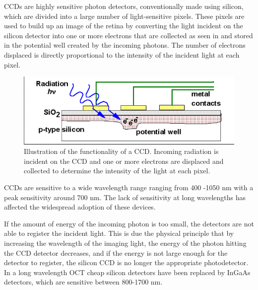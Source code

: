 CCDs are highly sensitive photon detectors, conventionally made using 
silicon, which are divided into a large number of light-sensitive pixels.  These 
pixels are used to build up an image of the retina by converting the light 
incident on the silicon detector into one or more electrons that are collected 
as seen in  and stored in the potential well created by the incoming 
photons. The number of electrons displaced is directly proportional to the 
intensity of the incident light at each pixel.

\begin{figure}[htbp]
\centering
\includegraphics{figures/CCDSchem}
\caption{Illustration of the functionality of a CCD.  Incoming radiation is incident on the CCD and one or more electrons are displaced and collected to determine the intensity of the light at each pixel. \cite{poo1} }
\label{fig:CCD}
\end{figure}

CCDs are sensitive to a wide wavelength range ranging from 400 -1050 nm 
with a peak sensitivity around 700 nm. The lack of sensitivity at long wavelengths
has affected the widespread adoption of these devices. \cite{poo2} 
 
If the amount of energy of the incoming photon is too small, the detectors are 
not able to register the incident light. This is due the physical principle that by
increasing the wavelength of the imaging light, the energy of the photon hitting
the CCD detector decreases, and if the energy is not large enough for the
detector to register, the silicon CCD is no longer the appropriate photodetector. 
In a long wavelength OCT cheap silicon detectors have been replaced by 
InGaAs detectors, which are sensitive between 800-1700 nm.

